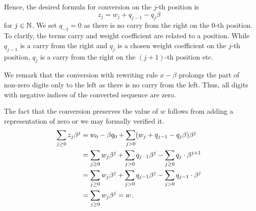     Hence, the desired formula for conversion on the $j$-th position is 
    \begin{equation*}
        z_j=w_j + q_{j-1} - q_j \beta
    \end{equation*}
    for $j \in \mathbb{N}$. We set $q_{-1}=0$ as there is no carry from the right on the 0-th position. To clarify, the terms carry and weight coefficient are related to a position. While $q_{j-1}$ is a carry from the right  and $q_j$ is a chosen weight coefficient on the $j$-th position, $q_j$ is a carry from the right on the $(j+1)$-th position etc.

We remark that the conversion with rewriting rule $x-\beta$ prolongs the part of non-zero digits only to the left as there is no carry from the left. Thus, all digits with negative indices of the converted sequence are zero.


     The fact that the conversion preserves the value of $w$ follows from adding a representation of zero or we may formally verified it.
\begin{align}
\label{eq:valuePreserving}
    \sum_{j\geq 0} z_j \beta^j &=w_0 - \beta q_0 + \sum_{j> 0} (w_j + q_{j-1} - q_j \beta) \beta^j \notag\\
    &=\sum_{j\geq 0} w_j \beta^j + \sum_{j>0} q_{j-1} \beta^j - \sum_{j\geq 0} q_j \cdot \beta^{j+1}  \\
    &=\sum_{j\geq 0} w_j \beta^j + \sum_{j>0} q_{j-1} \beta^j - \sum_{j> 0} q_{j-1} \cdot \beta^j \notag\\
    &=\sum_{j\geq 0} w_j \beta^j = w\,. \notag
\end{align}

